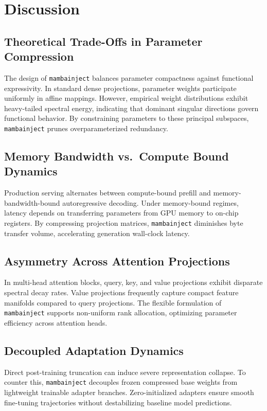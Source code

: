 \section{Discussion}

\subsection{Theoretical Trade-Offs in Parameter Compression}
The design of \texttt{mambainject} balances parameter compactness against functional expressivity. In standard dense projections, parameter weights participate uniformly in affine mappings. However, empirical weight distributions exhibit heavy-tailed spectral energy, indicating that dominant singular directions govern functional behavior. By constraining parameters to these principal subspaces, \texttt{mambainject} prunes overparameterized redundancy.

\subsection{Memory Bandwidth vs.\ Compute Bound Dynamics}
Production serving alternates between compute-bound prefill and memory-bandwidth-bound autoregressive decoding. Under memory-bound regimes, latency depends on transferring parameters from GPU memory to on-chip registers. By compressing projection matrices, \texttt{mambainject} diminishes byte transfer volume, accelerating generation wall-clock latency.

\subsection{Asymmetry Across Attention Projections}
In multi-head attention blocks, query, key, and value projections exhibit disparate spectral decay rates. Value projections frequently capture compact feature manifolds compared to query projections. The flexible formulation of \texttt{mambainject} supports non-uniform rank allocation, optimizing parameter efficiency across attention heads.

\subsection{Decoupled Adaptation Dynamics}
Direct post-training truncation can induce severe representation collapse. To counter this, \texttt{mambainject} decouples frozen compressed base weights from lightweight trainable adapter branches. Zero-initialized adapters ensure smooth fine-tuning trajectories without destabilizing baseline model predictions.

